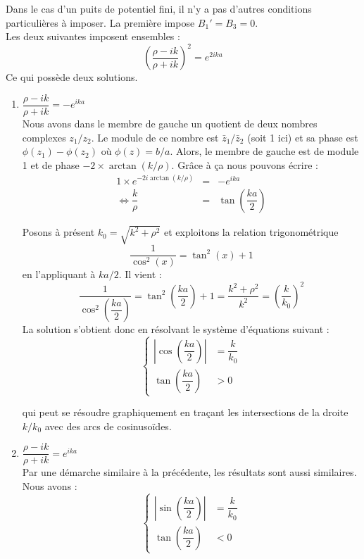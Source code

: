 \documentclass[12pt, a4paper]{book}
\begin{document}
  Dans le cas d'un puits de potentiel fini, il n'y a pas d'autres conditions particulières à imposer. La première impose $B_1' = B_3 = 0$. \\
  
  Les deux suivantes imposent ensembles :
  \begin{equation}
    \left(\dfrac{\rho - ik}{\rho + ik} \right) ^2 = e ^{2ika}
  \end{equation}
  Ce qui possède deux solutions.
  \begin{enumerate}[label = (\roman*)]
    \item $\dfrac{\rho - ik}{\rho + ik} = -e^{ika}$ \\
    Nous avons dans le membre de gauche un quotient de deux nombres complexes $z_1/z_2$. Le module de ce nombre est $\bar z_1/\bar z_2$ (soit 1 ici) et sa phase est $\phi(z_1) - \phi(z_2)$ où $\phi(z) = b/a$. Alors, le membre de gauche est de module 1 et de phase $-2\times \arctan(k/\rho)$. Grâce à ça nous pouvons écrire :
    \begin{eqnarray*}
      1\times e^{-2i\arctan(k/\rho)} &=& - e^{ika} \\
      \iff \dfrac{k}{\rho} &=& \tan\left(\dfrac{ka}{2}\right)
    \end{eqnarray*}
    
    Posons à présent $k_0 = \sqrt{k^2 + \rho ^2}$ et exploitons la relation trigonométrique $$\dfrac{1}{\cos ^2(x)} = \tan^2(x) +1$$ en l'appliquant à $ka/2$. Il vient :
    $$\dfrac{1}{\cos ^2\left(\dfrac{ka}{2}\right)} = \tan^2\left(\dfrac{ka}{2}\right) +1  = \dfrac{k^2 + \rho^2}{k^2} = \left(\dfrac{k}{k_0}\right)^2$$
    La solution s'obtient donc en résolvant le système d'équations suivant :
    \begin{equation}
      \left\{ \begin{array}{ll}
        \left| \cos \left(\dfrac{ka}{2}\right)\right| &= \dfrac{k}{k_0} \\
        \tan \left(\dfrac{ka}{2}\right) &>0
      \end{array}\right.
    \end{equation}
    
    qui peut se résoudre graphiquement en traçant les intersections de la droite $k/k_0$ avec des arcs de cosinusoïdes. \\
    \item $\dfrac{\rho - ik}{\rho + ik} = e^{ika}$ \\
    
    Par une démarche similaire à la précédente, les résultats sont aussi similaires. Nous avons :
    \begin{equation}
      \left\{ \begin{array}{ll}
        \left| \sin \left(\dfrac{ka}{2}\right)\right| &= \dfrac{k}{k_0} \\
      \tan \left(\dfrac{ka}{2}\right) &<0
    \end{array}\right.
  \end{equation}
\end{enumerate}
\end{document}
